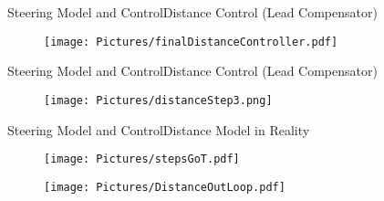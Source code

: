 \begin{frame}{Steering Model and Control}{Distance Control (Lead Compensator)}
  \begin{figure}[H]
    \centering
    \texttt{[image: Pictures/finalDistanceController.pdf]}
  \end{figure}
\end{frame}


\begin{frame}{Steering Model and Control}{Distance Control (Lead Compensator)}
  \begin{figure}[H]
    \centering
    \texttt{[image: Pictures/distanceStep3.png]}
  \end{figure}
\end{frame}

\begin{frame}{Steering Model and Control}{Distance Model in Reality}
    \begin{minipage}{\linewidth}
    \begin{minipage}{0.45\linewidth}
      \begin{figure}[H]
        \texttt{[image: Pictures/stepsGoT.pdf]}
        \centering
      \end{figure}
    \end{minipage}
    \hspace{0.03\linewidth}
    \begin{minipage}{0.45\linewidth}
      \begin{figure}[H]
        \texttt{[image: Pictures/DistanceOutLoop.pdf]}
        \centering
      \end{figure}
    \end{minipage}
  \end{minipage}
\end{frame}